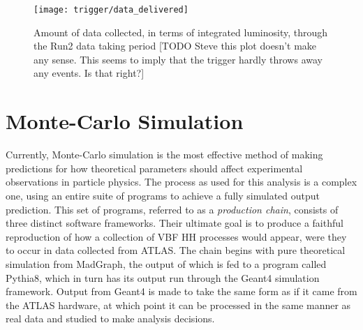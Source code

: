         \begin{figure}[h]
            \texttt{[image: trigger/data\_delivered]}
            \caption{Amount of data collected, in terms of integrated luminosity,
                through the Run2 data taking period\cite{data_quality}
                [TODO Steve this plot doesn't make any sense.
                This seems to imply that the trigger hardly throws away any events.
                Is that right?]}
            \label{fig:data_delivered}
        \end{figure}


\FloatBarrier
\section{Monte-Carlo Simulation} \label{sec:mcsim}
    
    Currently, Monte-Carlo simulation is the most effective method of making predictions
        for how theoretical parameters should affect experimental observations in particle physics.
    The process as used for this analysis is a complex one, using an entire suite of programs to achieve a fully simulated output prediction.
    This set of programs, referred to as a \textit{production chain}, consists of three distinct software frameworks.
    Their ultimate goal is to produce a faithful reproduction of how a collection of VBF \to HH processes would appear,
        were they to occur in data collected from ATLAS.
    The chain begins with pure theoretical simulation from MadGraph,
        the output of which is fed to a program called Pythia8,
        which in turn has its output run through the Geant4 simulation framework.
    Output from Geant4 is made to take the same form as if it came from the ATLAS hardware,
        at which point it can be processed in the same manner as real data and studied to make analysis decisions.


